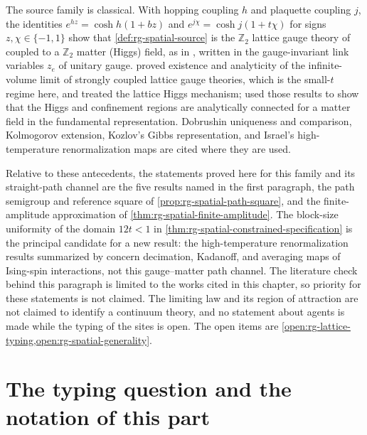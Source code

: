 The source family is classical. With hopping coupling \(h\) and plaquette
coupling \(j\), the identities \(e^{hz}=\cosh h(1+bz)\) and
\(e^{j\chi}=\cosh j(1+t\chi)\) for signs \(z,\chi\in\{-1,1\}\) show that
\cref{def:rg-spatial-source} is the \(\mathbb Z_2\) lattice gauge theory of
\citet{Wegner1971} coupled to a \(\mathbb Z_2\) matter (Higgs) field, as in
\citet{FradkinShenker1979}, written in the gauge-invariant link variables
\(z_e\) of unitary gauge. \citet{OsterwalderSeiler1978} proved existence and
analyticity of the infinite-volume limit of strongly coupled lattice gauge
theories, which is the small-\(t\) regime here, and treated the lattice
Higgs mechanism; \citet{FradkinShenker1979} used those results to show that
the Higgs and confinement regions are analytically connected for a matter
field in the fundamental representation. Dobrushin uniqueness and
comparison, Kolmogorov extension, Kozlov's Gibbs representation, and
Israel's high-temperature renormalization maps are cited where they are
used.

Relative to these antecedents, the statements proved here for this family
and its straight-path channel are the five results named in the first
paragraph, the path semigroup and reference square of
\cref{prop:rg-spatial-path-square}, and the finite-amplitude approximation
of \cref{thm:rg-spatial-finite-amplitude}. The block-size uniformity of the
domain \(12t<1\) in \cref{thm:rg-spatial-constrained-specification} is the
principal candidate for a new result: the
high-temperature renormalization results summarized by
\citet[Sec.~6.1.1]{VanEnterFernandezSokal1993} concern decimation,
Kadanoff, and averaging maps of Ising-spin interactions, not this
gauge--matter path channel. The literature check behind this paragraph is
limited to the works cited in this chapter, so priority for these
statements is not claimed. The limiting law and its region of attraction
are not claimed to identify a continuum theory, and no statement about
agents is made while the typing of the sites is open. The open items are
\cref{open:rg-lattice-typing,open:rg-spatial-generality}.

\section{The typing question and the notation of this part}
\label{sec:rg-lattice-typing}

